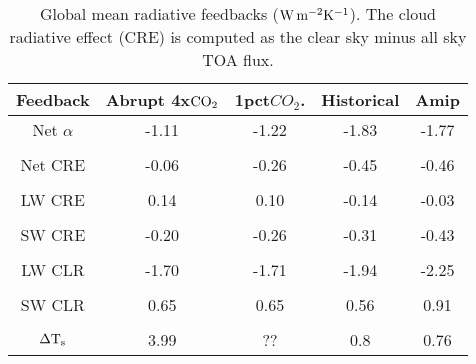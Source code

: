 \documentclass[draft]{agujournal2019}
\begin{document}
\begin{table}
\begin{center}
\caption{Global mean radiative feedbacks ($\rm{W\, m^{-2} K^{-1}}$).  The cloud radiative effect (CRE) is computed as
 the clear sky minus all sky TOA flux.}
    \begin{tabular}{*{5}{c}}
    \hline
    \hline
 Feedback   & Abrupt 4x$\rm{CO}_2$ & 1pct$CO_2$.   & Historical    &  Amip   \\ \hline
    Net $\alpha$         &   -1.11      &  -1.22          &  -1.83         & -1.77               \\ 
    \\
    Net CRE   & -0.06       &  -0.26          & -0.45         & -0.46           \\  
    \\
    LW CRE   & 0.14        &  0.10            & -0.14           & -0.03          \\  
    \\
    SW CRE  & -0.20       &  -0.26            & -0.31          & -0.43         \\  
    \\
    LW CLR   & -1.70       &  -1.71            & -1.94           & -2.25        \\  
    \\
    SW CLR  & 0.65        & 0.65              & 0.56             & 0.91          \\  
    \\
    $\Delta \rm{T}_s$        & 3.99        &  ??                & 0.8              & 0.76          \\  \hline

    \end{tabular}\par
    \label{tab:lambda}
\end{center}
\end{table}
\end{document}
